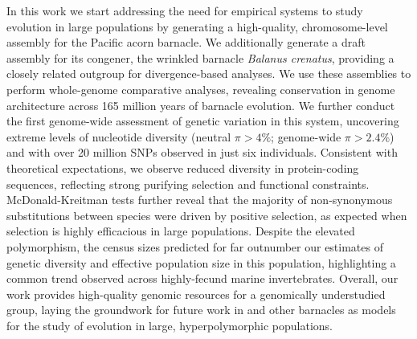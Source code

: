 In this work we start addressing the need for empirical systems to study evolution in
large populations by generating a high-quality, chromosome-level assembly for the Pacific
acorn barnacle.
We additionally generate a draft assembly for its congener, the wrinkled barnacle
\textit{Balanus crenatus}, providing a closely related outgroup for divergence-based analyses.
We use these assemblies to perform whole-genome comparative analyses, revealing conservation
in genome architecture across 165 million years of barnacle evolution.
We further conduct the first genome-wide assessment of genetic variation in this system,
uncovering extreme levels of nucleotide diversity (neutral $\pi > 4\%$; genome-wide
$\pi > 2.4\%$) and with over 20 million SNPs observed in just six individuals.
Consistent with theoretical expectations, we observe reduced diversity in protein-coding
sequences, reflecting strong purifying selection and functional
constraints.
McDonald-Kreitman tests further reveal that the majority of non-synonymous substitutions
between species were driven by positive selection, as expected when selection is highly
efficacious in large populations.
Despite the elevated polymorphism, the census sizes predicted for \bgla{} far outnumber
our estimates of genetic diversity and effective population size in this population,
highlighting a common trend observed across highly-fecund marine invertebrates.
Overall, our work provides high-quality genomic resources for a genomically understudied
group, laying the groundwork for future work in \bgla{} and other barnacles as models for
the study of evolution in large, hyperpolymorphic populations.
\vspace{0.1cm}


